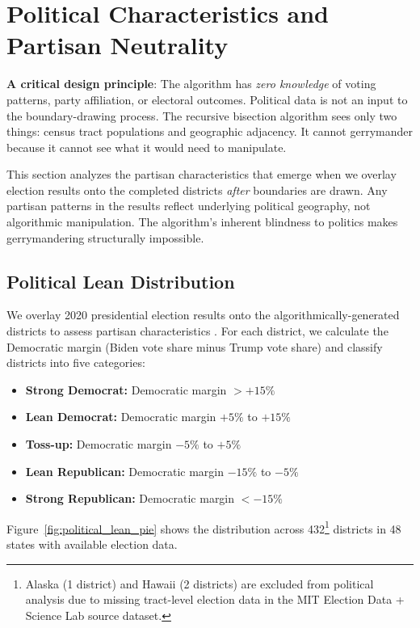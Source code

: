 \section{Political Characteristics and Partisan Neutrality}
\label{sec:analysis}

\textbf{A critical design principle}: The algorithm has \textit{zero knowledge} of voting patterns, party affiliation, or electoral outcomes. Political data is not an input to the boundary-drawing process. The recursive bisection algorithm sees only two things: census tract populations and geographic adjacency. It cannot gerrymander because it cannot see what it would need to manipulate.

This section analyzes the partisan characteristics that emerge when we overlay election results onto the completed districts \textit{after} boundaries are drawn. Any partisan patterns in the results reflect underlying political geography, not algorithmic manipulation. The algorithm's inherent blindness to politics makes gerrymandering structurally impossible.
\subsection{Political Lean Distribution}

We overlay 2020 presidential election results onto the algorithmically-generated districts to assess partisan characteristics \cite{ansolabehere2012mecubed}. For each district, we calculate the Democratic margin (Biden vote share minus Trump vote share) and classify districts into five categories:

\begin{itemize}
    \item \textbf{Strong Democrat:} Democratic margin $> +15\%$
    \item \textbf{Lean Democrat:} Democratic margin $+5\%$ to $+15\%$
    \item \textbf{Toss-up:} Democratic margin $-5\%$ to $+5\%$
    \item \textbf{Lean Republican:} Democratic margin $-15\%$ to $-5\%$
    \item \textbf{Strong Republican:} Democratic margin $< -15\%$
\end{itemize}

Figure~\ref{fig:political_lean_pie} shows the distribution across 432\footnote{Alaska (1 district) and Hawaii (2 districts) are excluded from political analysis due to missing tract-level election data in the MIT Election Data + Science Lab source dataset.} districts in 48 states with available election data.

